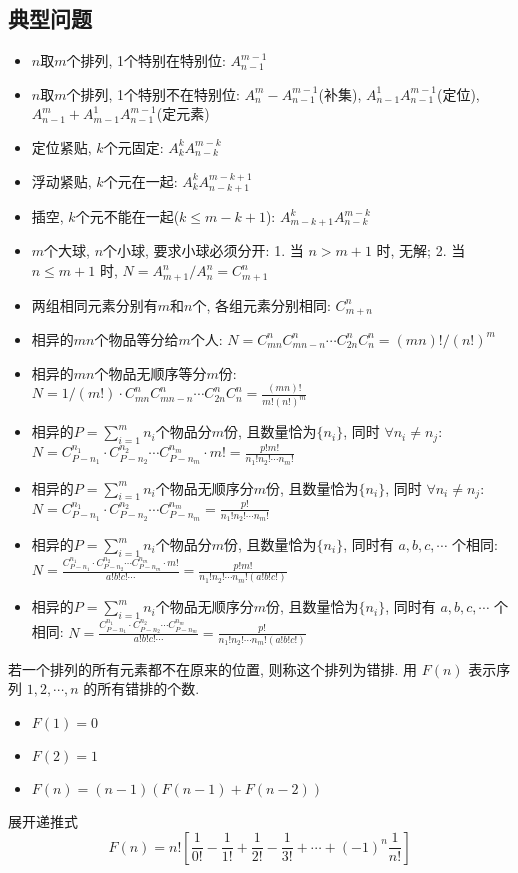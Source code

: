 \subsection{典型问题}

\begin{itemize}
\item $n$取$m$个排列, 1个特别在特别位: $A^{m-1}_{n-1}$
\item $n$取$m$个排列, 1个特别不在特别位: $A^{m}_{n} - A^{m-1}_{n-1}$(补集), $A^{1}_{n-1}A^{m-1}_{n-1}$(定位), $A^{m}_{n-1} + A^{1}_{m-1}A^{m-1}_{n-1}$(定元素)
\item 定位紧贴, $k$个元固定: $A^{k}_{k}A^{m-k}_{n-k}$
\item 浮动紧贴, $k$个元在一起: $A^{k}_{k}A^{m-k+1}_{n-k+1}$
\item 插空, $k$个元不能在一起($k \leq m - k + 1$): $A^{k}_{m-k+1}A^{m-k}_{n-k}$
\item $m$个大球, $n$个小球, 要求小球必须分开: 1. 当 $n>m+1$ 时, 无解; 2. 当 $n \leq m+1$ 时, $N = A^{n}_{m+1} / A^n_n = C^n_{m+1}$
\item 两组相同元素分别有$m$和$n$个, 各组元素分别相同: $C^n_{m+n}$
\item 相异的$mn$个物品等分给$m$个人: $N = C^n_{mn}C^n_{mn-n} \cdots C^n_{2n}C^n_{n} = (mn)! / (n!)^m$
\item 相异的$mn$个物品无顺序等分$m$份: $N = 1/ (m!) \cdot C^n_{mn}C^n_{mn-n} \cdots C^n_{2n}C^n_{n} = \frac{(mn)!}{m!(n!)^m}$
\item 相异的$P = \sum^m_{i = 1} n_i$个物品分$m$份, 且数量恰为$\{n_i\}$, 同时 $\forall n_i \ne n_j$: $N = C^{n_1}_{P-n_1} \cdot C^{n_2}_{P-n_2} \cdots C^{n_m}_{P-n_m} \cdot m! = \frac{p!m!}{n_1!n_2! \cdots n_m!}$
\item 相异的$P = \sum^m_{i = 1} n_i$个物品无顺序分$m$份, 且数量恰为$\{n_i\}$, 同时 $\forall n_i \ne n_j$: $N = C^{n_1}_{P-n_1} \cdot C^{n_2}_{P-n_2} \cdots C^{n_m}_{P-n_m} = \frac{p!}{n_1!n_2! \cdots n_m!}$
\item 相异的$P = \sum^m_{i = 1} n_i$个物品分$m$份, 且数量恰为$\{n_i\}$, 同时有 $a, b, c, \cdots$ 个相同: $N = \frac{C^{n_1}_{P-n_1} \cdot C^{n_2}_{P-n_2} \cdots C^{n_m}_{P-n_m} \cdot m!}{a!b!c!\cdots} = \frac{p!m!}{n_1!n_2! \cdots n_m! (a!b!c!)}$
\item 相异的$P = \sum^m_{i = 1} n_i$个物品无顺序分$m$份, 且数量恰为$\{n_i\}$, 同时有 $a, b, c, \cdots$ 个相同: $N = \frac{C^{n_1}_{P-n_1} \cdot C^{n_2}_{P-n_2} \cdots C^{n_m}_{P-n_m}}{a!b!c!\cdots} = \frac{p!}{n_1!n_2! \cdots n_m! (a!b!c!)}$
\end{itemize}

\begin{defination}[错排公式]
若一个排列的所有元素都不在原来的位置, 则称这个排列为错排. 用 $F(n)$ 表示序列 $1, 2, \cdots, n$ 的所有错排的个数.
\begin{itemize}
\item $F(1) = 0$
\item $F(2) = 1$
\item $F(n) = (n-1)(F(n-1) + F(n-2))$
\end{itemize}
展开递推式
\[
F(n) = n! \left[\frac{1}{0!} - \frac{1}{1!} + \frac{1}{2!} - \frac{1}{3!} + \cdots + (-1)^{n}\frac{1}{n!}\right]
\]
\end{defination}
\endinput
